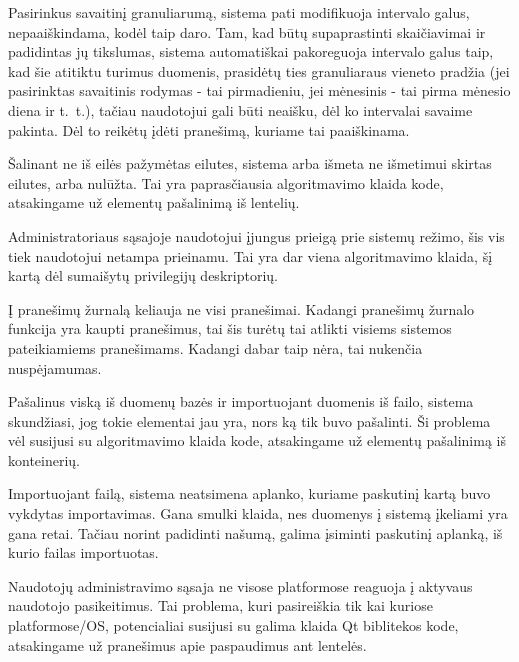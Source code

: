 {
  Pasirinkus savaitinį granuliarumą, sistema pati modifikuoja intervalo
  galus, nepaaiškindama, kodėl taip daro.
}
{
  Tam, kad būtų supaprastinti skaičiavimai ir padidintas jų tikslumas,
  sistema automatiškai pakoreguoja intervalo galus taip, kad šie atitiktu
  turimus duomenis, prasidėtų ties granuliaraus vieneto pradžia (jei
  pasirinktas savaitinis rodymas - tai pirmadieniu, jei mėnesinis - tai
  pirma mėnesio diena ir t.~t.), tačiau naudotojui gali būti neaišku, dėl
  ko intervalai savaime pakinta. Dėl to reikėtų įdėti pranešimą, kuriame tai
  paaiškinama.
}

{
  Šalinant ne iš eilės pažymėtas eilutes, sistema arba išmeta ne išmetimui
  skirtas eilutes, arba nulūžta.
}
{
  Tai yra paprasčiausia algoritmavimo klaida kode, atsakingame už elementų
  pašalinimą iš lentelių.
}

{
  Administratoriaus sąsajoje naudotojui įjungus prieigą prie sistemų
  režimo, šis vis tiek naudotojui netampa prieinamu.
}
{
  Tai yra dar viena algoritmavimo klaida, šį kartą dėl sumaišytų privilegijų
  deskriptorių.
}

{
  Į pranešimų žurnalą keliauja ne visi pranešimai.
}
{
  Kadangi pranešimų žurnalo funkcija yra kaupti pranešimus, tai šis turėtų tai atlikti
  visiems sistemos pateikiamiems pranešimams. Kadangi dabar taip nėra, tai nukenčia
  nuspėjamumas.
}

{
  Pašalinus viską iš duomenų bazės ir importuojant duomenis iš failo,
  sistema skundžiasi, jog tokie elementai jau yra, nors ką tik buvo pašalinti.
}
{
  Ši problema vėl susijusi su algoritmavimo klaida kode, atsakingame už
  elementų pašalinimą iš konteinerių.
}

{
  Importuojant failą, sistema neatsimena aplanko, kuriame paskutinį
  kartą buvo vykdytas importavimas.
}
{
  Gana smulki klaida, nes duomenys į sistemą įkeliami yra gana retai. Tačiau norint
  padidinti našumą, galima įsiminti paskutinį aplanką, iš kurio failas importuotas.
}

{
  Naudotojų administravimo sąsaja ne visose platformose reaguoja į
  aktyvaus naudotojo pasikeitimus.
}
{
  Tai problema, kuri pasireiškia tik kai kuriose platformose/OS, potencialiai susijusi
  su galima klaida Qt biblitekos kode, atsakingame už pranešimus apie paspaudimus ant 
  lentelės.
}


